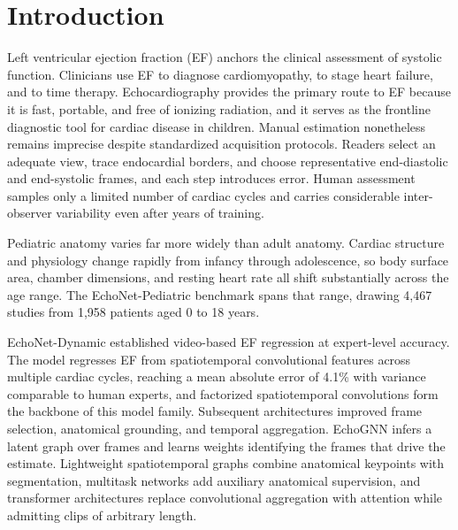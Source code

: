 \documentclass{ws-procs11x85}
\begin{document}

\newpage


\section{Introduction}

Left ventricular ejection fraction (EF) anchors the clinical assessment of systolic function.
Clinicians use EF to diagnose cardiomyopathy, to stage heart failure, and to time therapy.
Echocardiography provides the primary route to EF because it is fast, portable, and free of ionizing radiation, and it serves as the frontline diagnostic tool for cardiac disease in children.\cite{ouyang2020echonetdynamic,reddy2023echonetpeds}
Manual estimation nonetheless remains imprecise despite standardized acquisition protocols.
Readers select an adequate view, trace endocardial borders, and choose representative end-diastolic and end-systolic frames, and each step introduces error.
Human assessment samples only a limited number of cardiac cycles and carries considerable inter-observer variability even after years of training.\cite{ouyang2020echonetdynamic}

Pediatric anatomy varies far more widely than adult anatomy.
Cardiac structure and physiology change rapidly from infancy through adolescence, so body surface area, chamber dimensions, and resting heart rate all shift substantially across the age range.
The EchoNet-Pediatric benchmark spans that range, drawing 4,467 studies from 1,958 patients aged 0 to 18 years.\cite{reddy2023echonetpeds}

EchoNet-Dynamic established video-based EF regression at expert-level accuracy.
The model regresses EF from spatiotemporal convolutional features across multiple cardiac cycles, reaching a mean absolute error of 4.1\% with variance comparable to human experts,\cite{ouyang2020echonetdynamic} and factorized spatiotemporal convolutions form the backbone of this model family.\cite{tran2018r2plus1d}
Subsequent architectures improved frame selection, anatomical grounding, and temporal aggregation.
EchoGNN infers a latent graph over frames and learns weights identifying the frames that drive the estimate.\cite{mokhtari2022echognn}
Lightweight spatiotemporal graphs combine anatomical keypoints with segmentation,\cite{thomas2022echographs} multitask networks add auxiliary anatomical supervision,\cite{li2023echoefnet} and transformer architectures replace convolutional aggregation with attention while admitting clips of arbitrary length.\cite{reynaud2021uvt}
\end{document}
